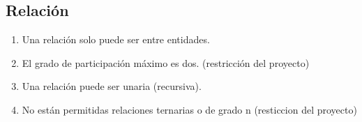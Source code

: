 \subsection{Relación}

\begin{enumerate}
    \item Una relación solo puede ser entre entidades.
    \item El grado de participación máximo es dos. (restricción del proyecto)
    \item Una relación puede ser unaria (recursiva).
    \item No están permitidas relaciones ternarias o de grado n (resticcion del proyecto)
\end{enumerate}
